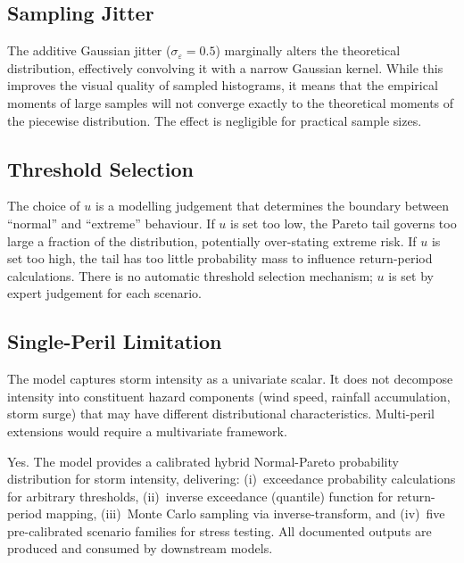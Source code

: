 \documentclass[11pt,a4paper]{article}
\begin{document}
\subsection{Sampling Jitter}

The additive Gaussian jitter ($\sigma_\varepsilon = 0.5$) marginally alters the
theoretical distribution, effectively convolving it with a narrow Gaussian kernel.
While this improves the visual quality of sampled histograms, it means that the
empirical moments of large samples will not converge exactly to the theoretical
moments of the piecewise distribution. The effect is negligible for practical
sample sizes.

\subsection{Threshold Selection}

The choice of $u$ is a modelling judgement that determines the boundary between
``normal'' and ``extreme'' behaviour. If $u$ is set too low, the Pareto tail
governs too large a fraction of the distribution, potentially over-stating
extreme risk. If $u$ is set too high, the tail has too little probability mass
to influence return-period calculations. There is no automatic threshold
selection mechanism; $u$ is set by expert judgement for each scenario.

\subsection{Single-Peril Limitation}

The model captures storm intensity as a univariate scalar. It does not decompose
intensity into constituent hazard components (wind speed, rainfall accumulation,
storm surge) that may have different distributional characteristics. Multi-peril
extensions would require a multivariate framework.

\mkmgovernance

Yes. The model provides a calibrated hybrid Normal-Pareto probability distribution for storm intensity, delivering: (i)~exceedance probability calculations for arbitrary thresholds, (ii)~inverse exceedance (quantile) function for return-period mapping, (iii)~Monte Carlo sampling via inverse-transform, and (iv)~five pre-calibrated scenario families for stress testing. All documented outputs are produced and consumed by downstream models.
\end{document}
